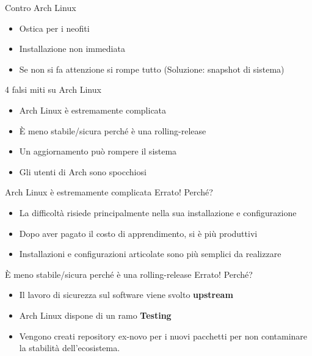 
\begin{frame}{Contro Arch Linux}
    \begin{itemize}
        \item Ostica per i neofiti
        \item Installazione non immediata
        \item Se non si fa attenzione si rompe tutto (Soluzione: snapshot di sistema)
    \end{itemize}
\end{frame}


\begin{frame}{4 falsi miti su Arch Linux}
    \begin{itemize}
        \item Arch Linux è estremamente complicata
        \item È meno stabile/sicura perché è una rolling-release
        \item Un aggiornamento può rompere il sistema
        \item Gli utenti di Arch sono spocchiosi
    \end{itemize}
\end{frame}


\begin{frame}{Arch Linux è estremamente complicata}
    \alert{Errato!} Perché?
    \begin{itemize}
        \item La difficoltà risiede principalmente nella sua installazione e configurazione
        \item Dopo aver pagato il costo di apprendimento, si è più produttivi
        \item Installazioni e configurazioni articolate sono più semplici da realizzare
        
    \end{itemize}
\end{frame}


\begin{frame}{È meno stabile/sicura perché è una rolling-release}
    \alert{Errato!} Perché?
    \begin{itemize}
        \item Il lavoro di sicurezza sul software viene svolto \textbf{upstream}
        \item Arch Linux dispone di un ramo \textbf{Testing}
        \item Vengono creati repository ex-novo per i nuovi pacchetti per non contaminare la stabilità dell'ecosistema.
    \end{itemize}
\end{frame}

